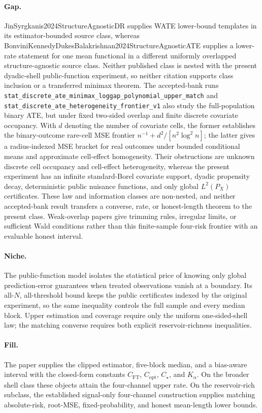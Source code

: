 \documentclass{article}
\begin{document}
\paragraph{Gap.} JinSyrgkanis2024StructureAgnosticDR supplies WATE lower-bound templates in its estimator-bounded source class, whereas BonviniKennedyDukesBalakrishnan2024StructureAgnosticATE supplies a lower-rate statement for one mean functional in a different uniformly overlapped structure-agnostic source class. Neither published class is nested with the present dyadic-shell public-function experiment, so neither citation supports class inclusion or a transferred minimax theorem. The accepted-bank runs \texttt{stat\_discrete\_ate\_minimax\_loggap\_polynomial\_upper\_match} and \texttt{stat\_discrete\_ate\_heterogeneity\_frontier\_v1} also study the full-population binary ATE, but under fixed two-sided overlap and finite discrete covariate occupancy. With \(d\) denoting the number of covariate cells, the former establishes the binary-outcome rare-cell MSE frontier \(n^{-1}+d^2/[n^2\log^2 n]\); the latter gives a radius-indexed MSE bracket for real outcomes under bounded conditional means and approximate cell-effect homogeneity. Their obstructions are unknown discrete cell occupancy and cell-effect heterogeneity, whereas the present experiment has an infinite standard-Borel covariate support, dyadic propensity decay, deterministic public nuisance functions, and only global \(L^2(P_X)\) certificates. These law and information classes are non-nested, and neither accepted-bank result transfers a converse, rate, or honest-length theorem to the present class. Weak-overlap papers give trimming rules, irregular limits, or sufficient Wald conditions rather than this finite-sample four-risk frontier with an evaluable honest interval.

\paragraph{Niche.} The public-function model isolates the statistical price of knowing only global prediction-error guarantees when treated observations vanish at a boundary.  Its all-\(N\), all-threshold bound keeps the public certificates indexed by the original experiment, so the same inequality controls the full sample and every median block.  Upper estimation and coverage require only the uniform one-sided-shell law; the matching converse requires both explicit reservoir-richness inequalities.

\paragraph{Fill.} The paper supplies the clipped estimator, five-block median, and a bias-aware interval with the closed-form constants \(C_{\mathrm{FT}}\), \(C_{\mathrm{opt}}\), \(C_\star\), and \(K_\alpha\).  On the broader shell class these objects attain the four-channel upper rate.  On the reservoir-rich subclass, the established signal-only four-channel construction supplies matching absolute-risk, root-MSE, fixed-probability, and honest mean-length lower bounds.
\end{document}
